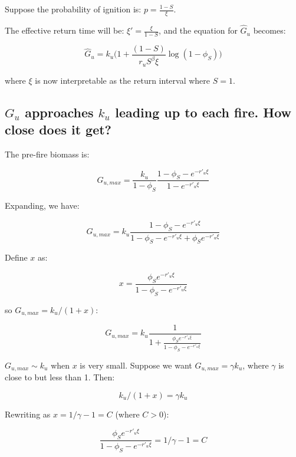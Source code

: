 \documentclass{article}
\begin{document}
Suppose the probability of ignition is: $p = \frac{1-S}{\xi}$.

The effective return time will be: $\xi' = \frac{\xi} { 1- S}$, and the equation for $\hat{G}_u $ becomes:

\begin{equation}
\hat{G}_u =
  k_u \big( 1 + \frac{(1-S)}{r_u S^\beta \xi} \log(1-\phi_S) \big)
\end{equation}

where $\xi$ is now interpretable as the return interval where $S=1$.

 \subsection*{ $G_u$ approaches $k_u$  leading up to each fire. How close does it get?}

The  pre-fire biomass is:

\begin{equation}
  G_{u,max} =  \frac{k_u }{1-\phi_S}   \frac{1- \phi_S - e^{-r'_u \xi} }{1 - e^{-r'_u \xi}}
  \label{G_u_max}
\end{equation}

Expanding, we have:

\begin{equation}
  G_{u,max} =  k_u  \frac{1- \phi_S - e^{-r'_u \xi} }{1  - \phi_S - e^{-r'_u \xi} + \phi_S  e^{-r'_u \xi}}
\end{equation}


Define $x$ as:

\begin{equation}
x = \frac{ \phi_S  e^{-r'_u \xi}}{1- \phi_S - e^{-r'_u \xi}}
\end{equation}

so $ G_{u,max} = k_u /(1+x)$:

\begin{equation}
G_{u,max}  = k_u \frac{1}{1 + \frac{ \phi_S  e^{-r'_u \xi}}{1- \phi_S - e^{-r'_u \xi}}}
\end{equation}


$G_{u,max} \sim k_u$ when $x$ is very small.
Suppose we want $G_{u,max} = \gamma k_u$, where $\gamma$ is close to but less than 1.  Then:


\begin{equation}
 k_u /(1+x) = \gamma k_u
\end{equation}

Rewriting as  $x = 1/\gamma  - 1= C$ (where $C> 0$):

\begin{equation}
 \frac{ \phi_S  e^{-r'_u \xi}}{1- \phi_S - e^{-r'_u \xi}} =  1/\gamma  - 1 = C
\end{equation}
\end{document}
